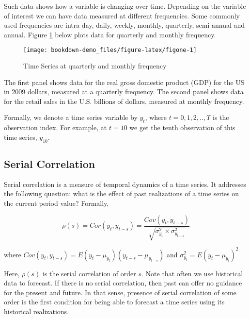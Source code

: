 \documentclass[]{book}
\theoremstyle{definition}
\theoremstyle{definition}
\theoremstyle{definition}
\theoremstyle{remark}
\begin{document}
Such data shows how a variable is changing over time. Depending on the
variable of interest we can have data measured at different frequencies.
Some commonly used frequencies are intra-day, daily, weekly, monthly,
quarterly, semi-annual and annual. Figure \ref{fig:figone} below plots
data for quarterly and monthly frequency.

\begin{figure}

{\centering \texttt{[image: bookdown-demo\_files/figure-latex/figone-1]} 

}

\caption{Time Series at quarterly and monthly frequency}\label{fig:figone}
\end{figure}

The first panel shows data for the real gross domestic product (GDP) for
the US in 2009 dollars, measured at a quarterly frequency. The second
panel shows data for the retail sales in the U.S. billions of dollars,
measured at monthly frequency.

Formally, we denote a time series variable by \(y_t\), where
\(t=0,1,2,..,T\) is the observation index. For example, at \(t=10\) we
get the tenth observation of this time series, \(y_{10}\).

\subsection{Serial Correlation}\label{serial-correlation}

Serial correlation is a measure of temporal dynamics of a time series.
It addresses the following question: what is the effect of past
realizations of a time series on the current period value? Formally,

\begin{equation}
\rho(s)=Cor(y_t, y_{t-s}) =\frac{   Cov(y_t,y_{t-s})}{\sqrt{\sigma^2_{y_t} \times \sigma^2_{y_{t-s}}}}
\end{equation}

where \(Cov(y_t,y_{t-s})= E(y_t-\mu_{y_t})(y_{t-s}-\mu_{y_{t-s}})\) and
\(\sigma^2_{y_t}=E(y_t-\mu_{y_t})^2\)

Here, \(\rho(s)\) is the serial correlation of order \(s\). Note that
often we use historical data to forecast. If there is no serial
correlation, then past can offer no guidance for the present and future.
In that sense, presence of serial correlation of some order is the first
condition for being able to forecast a time series using its historical
realizations.
\end{document}
